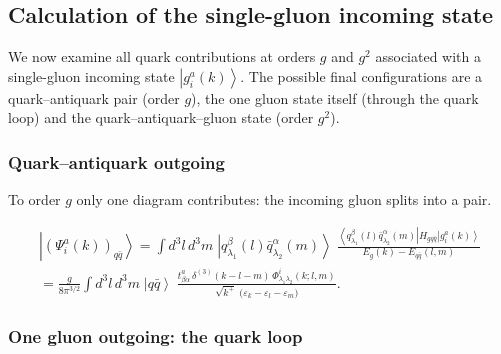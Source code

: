 \documentclass[11pt,a4paper]{article}
\numberwithin{equation}{section}
\newcommand{\eps}{\varepsilon}
\newcommand{\dthree}{\delta^{(3)}}
\newcommand{\ket}[1]{\left|#1\right\rangle}
\newcommand{\bra}[1]{\left\langle#1\right|}
\newcommand{\Ph}{\Phi}
\newcommand{\qk}[3]{q^{#1}_{#2}(#3)}
\newcommand{\aqk}[3]{\bar q^{#1}_{#2}(#3)}
\newcommand{\gl}[3]{g^{#1}_{#2}(#3)}
\begin{document}
\subsection{Calculation of the single-gluon incoming state}
\label{sec:wf-g}

We now examine all quark contributions at orders $g$ and $g^{2}$ associated with a single-gluon
incoming state $\ket{\gl{a}{i}{k}}$. The possible final configurations are a quark--antiquark pair
(order $g$), the one gluon state itself (through the quark loop) and the quark--antiquark--gluon
state (order $g^{2}$).

\subsubsection{Quark--antiquark outgoing}

To order $g$ only one diagram contributes: the incoming gluon splits into a pair.
\begin{center}
\end{center}
\begin{multline}
\ket{(\Psi^{a}_{i}(k))_{q\bar q}}=\int\! d^{3}l\,d^{3}m\;
\ket{\qk{\beta}{\lambda_{1}}{l}\aqk{\alpha}{\lambda_{2}}{m}}\;
\frac{\bra{\qk{\beta}{\lambda_{1}}{l}\aqk{\alpha}{\lambda_{2}}{m}}H_{gq\bar q}\ket{\gl{a}{i}{k}}}
{E_{g}(k)-E_{q\bar q}(l,m)}
\\
=\frac{g}{8\pi^{3/2}}\int\! d^{3}l\,d^{3}m\;\ket{q\bar q}\;
\frac{t^{a}_{\beta\alpha}\,\dthree(k-l-m)\,\Ph^{i}_{\lambda_{1}\lambda_{2}}(k;l,m)}
{\sqrt{k^{+}}\;\big(\eps_{k}-\eps_{l}-\eps_{m}\big)} .
\label{eq:Pg}
\end{multline}

\subsubsection{One gluon outgoing: the quark loop}
\end{document}
